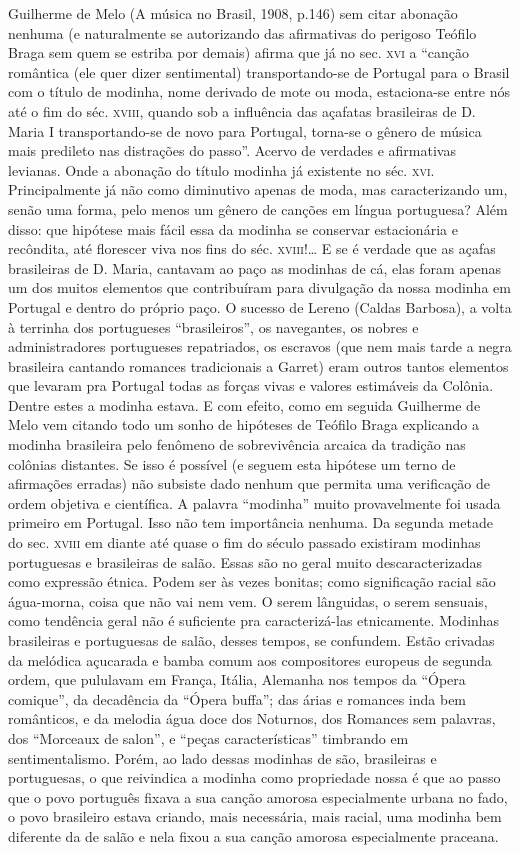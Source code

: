 Guilherme de Melo (A música no Brasil, 1908, p.146) sem citar abonação
nenhuma (e naturalmente se autorizando das afirmativas do perigoso
Teófilo Braga sem quem se estriba por demais) afirma que já no sec. \textsc{xvi}
a ``canção romântica (ele quer dizer sentimental) transportando-se de
Portugal para o Brasil com o título de modinha, nome derivado de mote ou
moda, estaciona-se entre nós até o fim do séc. \textsc{xviii}, quando sob a
influência das açafatas brasileiras de D. Maria I transportando-se de
novo para Portugal, torna-se o gênero de música mais predileto nas
distrações do passo''. Acervo de verdades e afirmativas levianas. Onde a
abonação do título modinha já existente no séc. \textsc{xvi}. Principalmente já
não como diminutivo apenas de moda, mas caracterizando um, senão uma
forma, pelo menos um gênero de canções em língua portuguesa? Além disso:
que hipótese mais fácil essa da modinha se conservar estacionária e
recôndita, até florescer viva nos fins do séc. \textsc{xviii}!\ldots{} E se é verdade
que as açafas brasileiras de D. Maria, cantavam ao paço as modinhas de
cá, elas foram apenas um dos muitos elementos que contribuíram para
divulgação da nossa modinha em Portugal e dentro do próprio paço. O
sucesso de Lereno (Caldas Barbosa), a volta à terrinha dos portugueses
``brasileiros'', os navegantes, os nobres e administradores portugueses
repatriados, os escravos (que nem mais tarde a negra brasileira cantando
romances tradicionais a Garret) eram outros tantos elementos que levaram
pra Portugal todas as forças vivas e valores estimáveis da Colônia.
Dentre estes a modinha estava. E com efeito, como em seguida Guilherme
de Melo vem citando todo um sonho de hipóteses de Teófilo Braga
explicando a modinha brasileira pelo fenômeno de sobrevivência arcaica
da tradição nas colônias distantes. Se isso é possível (e seguem esta
hipótese um terno de afirmações erradas) não subsiste dado nenhum que
permita uma verificação de ordem objetiva e científica. A palavra
``modinha'' muito provavelmente foi usada primeiro em Portugal. Isso não
tem importância nenhuma. Da segunda metade do sec. \textsc{xviii} em diante até
quase o fim do século passado existiram modinhas portuguesas e
brasileiras de salão. Essas são no geral muito descaracterizadas como
expressão étnica. Podem ser às vezes bonitas; como significação racial
são água-morna, coisa que não vai nem vem. O serem lânguidas, o serem
sensuais, como tendência geral não é suficiente pra caracterizá-las
etnicamente. Modinhas brasileiras e portuguesas de salão, desses tempos,
se confundem. Estão crivadas da melódica açucarada e bamba comum aos
compositores europeus de segunda ordem, que pululavam em França, Itália,
Alemanha nos tempos da ``Ópera comique'', da decadência da ``Ópera buffa'';
das árias e romances inda bem românticos, e da melodia água doce dos
Noturnos, dos Romances sem palavras, dos ``Morceaux de salon'', e ``peças
características'' timbrando em sentimentalismo. Porém, ao lado dessas
modinhas de são, brasileiras e portuguesas, o que reivindica a modinha
como propriedade nossa é que ao passo que o povo português fixava a sua
canção amorosa especialmente urbana no fado, o povo brasileiro estava
criando, mais necessária, mais racial, uma modinha bem diferente da de
salão e nela fixou a sua canção amorosa especialmente praceana.

